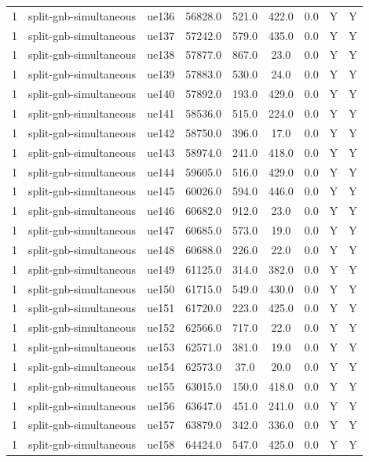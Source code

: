 \begin{table}[ht]
\begin{tabular}{|c|c|c|c|c|c|c|c|c|}
1 & split-gnb-simultaneous & ue136 & 56828.0 & 521.0 & 422.0 & 0.0 & Y & Y \\
1 & split-gnb-simultaneous & ue137 & 57242.0 & 579.0 & 435.0 & 0.0 & Y & Y \\
1 & split-gnb-simultaneous & ue138 & 57877.0 & 867.0 & 23.0 & 0.0 & Y & Y \\
1 & split-gnb-simultaneous & ue139 & 57883.0 & 530.0 & 24.0 & 0.0 & Y & Y \\
1 & split-gnb-simultaneous & ue140 & 57892.0 & 193.0 & 429.0 & 0.0 & Y & Y \\
1 & split-gnb-simultaneous & ue141 & 58536.0 & 515.0 & 224.0 & 0.0 & Y & Y \\
1 & split-gnb-simultaneous & ue142 & 58750.0 & 396.0 & 17.0 & 0.0 & Y & Y \\
1 & split-gnb-simultaneous & ue143 & 58974.0 & 241.0 & 418.0 & 0.0 & Y & Y \\
1 & split-gnb-simultaneous & ue144 & 59605.0 & 516.0 & 429.0 & 0.0 & Y & Y \\
1 & split-gnb-simultaneous & ue145 & 60026.0 & 594.0 & 446.0 & 0.0 & Y & Y \\
1 & split-gnb-simultaneous & ue146 & 60682.0 & 912.0 & 23.0 & 0.0 & Y & Y \\
1 & split-gnb-simultaneous & ue147 & 60685.0 & 573.0 & 19.0 & 0.0 & Y & Y \\
1 & split-gnb-simultaneous & ue148 & 60688.0 & 226.0 & 22.0 & 0.0 & Y & Y \\
1 & split-gnb-simultaneous & ue149 & 61125.0 & 314.0 & 382.0 & 0.0 & Y & Y \\
1 & split-gnb-simultaneous & ue150 & 61715.0 & 549.0 & 430.0 & 0.0 & Y & Y \\
1 & split-gnb-simultaneous & ue151 & 61720.0 & 223.0 & 425.0 & 0.0 & Y & Y \\
1 & split-gnb-simultaneous & ue152 & 62566.0 & 717.0 & 22.0 & 0.0 & Y & Y \\
1 & split-gnb-simultaneous & ue153 & 62571.0 & 381.0 & 19.0 & 0.0 & Y & Y \\
1 & split-gnb-simultaneous & ue154 & 62573.0 & 37.0 & 20.0 & 0.0 & Y & Y \\
1 & split-gnb-simultaneous & ue155 & 63015.0 & 150.0 & 418.0 & 0.0 & Y & Y \\
1 & split-gnb-simultaneous & ue156 & 63647.0 & 451.0 & 241.0 & 0.0 & Y & Y \\
1 & split-gnb-simultaneous & ue157 & 63879.0 & 342.0 & 336.0 & 0.0 & Y & Y \\
1 & split-gnb-simultaneous & ue158 & 64424.0 & 547.0 & 425.0 & 0.0 & Y & Y \\

\end{tabular}
\end{table}
